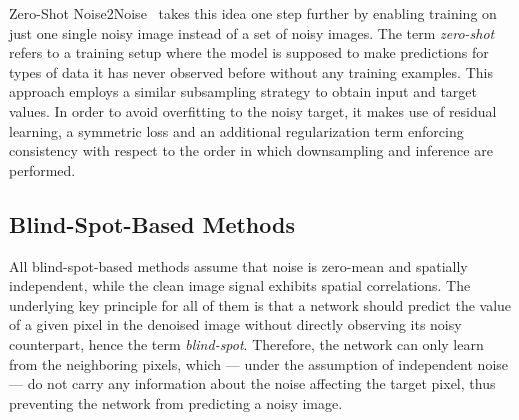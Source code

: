 Zero-Shot Noise2Noise~\cite{ZS-N2N} takes this idea one step further by enabling training on just one single noisy image instead of a set of noisy images.
The term \textit{zero-shot} refers to a training setup where the model is supposed to make predictions for types of data it has never observed before without any training examples.
This approach employs a similar subsampling strategy to obtain input and target values.
In order to avoid overfitting to the noisy target, it makes use of residual learning, a symmetric loss and an additional regularization term enforcing consistency with respect to the order in which downsampling and inference are performed.

\subsection{Blind-Spot-Based Methods}

All blind-spot-based methods assume that noise is zero-mean and spatially independent, while the clean image signal exhibits spatial correlations.
The underlying key principle for all of them is that a network should predict the value of a given pixel in the denoised image without directly observing its noisy counterpart, hence the term \textit{blind-spot}.
Therefore, the network can only learn from the neighboring pixels, which --- under the assumption of independent noise --- do not carry any information about the noise affecting the target pixel, thus preventing the network from predicting a noisy image.

